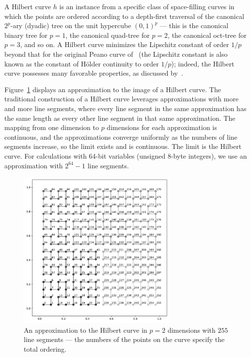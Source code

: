 \documentclass{article}
\begin{document}
A Hilbert curve $h$ is an instance from a specific class
of space-filling curves in which the points are ordered according
to a depth-first traversal of the canonical $2^p$-ary (dyadic) tree
on the unit hypercube $(0, 1)^p$
--- this is the canonical binary tree for $p = 1$,
the canonical quad-tree for $p = 2$, the canonical oct-tree for $p = 3$,
and so on. A Hilbert curve minimizes the Lipschitz constant of order $1/p$
beyond that for the original Peano curve of~\cite{peano}
(the Lipschitz constant is also known as the constant of H\"older continuity
to order $1/p$); indeed, the Hilbert curve possesses many favorable properties,
as discussed by~\cite{moon-jagadish-faloutsos-saltz}.

Figure~\ref{hilbert} displays an approximation to the image of a Hilbert curve.
The traditional construction of a Hilbert curve leverages approximations
with more and more line segments, where every line segment
in the same approximation has the same length as every other line segment
in that same approximation. The mapping from one dimension to $p$ dimensions 
for each approximation is continuous, and the approximations converge uniformly
as the numbers of line segments increase, so the limit exists
and is continuous. The limit is the Hilbert curve.
For calculations with 64-bit variables (unsigned 8-byte integers),
we use an approximation with $2^{64} - 1$ line segments.

\begin{figure}
\begin{centering}
\hfil\parbox{0.71\textwidth}
{\includegraphics[width=0.71\textwidth]{../codes/hilbert.pdf}}
\end{centering}
\caption{An approximation to the Hilbert curve in $p = 2$ dimensions
with $255$ line segments --- the numbers of the points on the curve
specify the total ordering.}
\label{hilbert}
\end{figure}
\end{document}

